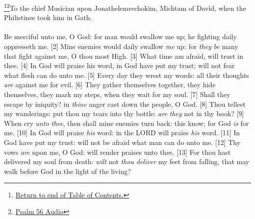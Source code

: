 \footnote{\textcolor[rgb]{0.00,0.25,0.00}{\hyperlink{PsalmsTOC}{Return to end of Table of Contents.}}}\footnote{\href{https://audiobible.com/bible/psalms_56.html}{\textcolor[cmyk]{0.99998,1,0,0}{Psalm 56 Audio}}}\textcolor[cmyk]{0.99998,1,0,0}{To the chief Musician upon Jonathelemrechokim, Michtam of David, when the Philistines took him in Gath.}\\
\\
\textcolor[cmyk]{0.99998,1,0,0}{Be merciful unto me, O God: for man would swallow me up; he fighting daily oppresseth me.}
[2] \textcolor[cmyk]{0.99998,1,0,0}{Mine enemies would daily swallow \emph{me} up: for \emph{they} \emph{be} many that fight against me, O thou most High.}
[3] \textcolor[cmyk]{0.99998,1,0,0}{What time  am afraid,  will trust in thee.}
[4] \textcolor[cmyk]{0.99998,1,0,0}{In God  will praise his word, in God  have put my trust;  will not fear what flesh can do unto me.}
[5] \textcolor[cmyk]{0.99998,1,0,0}{Every day they wrest my words: all their thoughts \emph{are} against me for evil.}
[6] \textcolor[cmyk]{0.99998,1,0,0}{They gather themselves together, they hide themselves, they mark my steps, when they wait for my soul.}
[7] \textcolor[cmyk]{0.99998,1,0,0}{Shall they escape by iniquity? in \emph{thine} anger cast down the people, O God.}
[8] \textcolor[cmyk]{0.99998,1,0,0}{Thou tellest my wanderings: put thou my tears into thy bottle: \emph{are} \emph{they} not in thy book?}
[9] \textcolor[cmyk]{0.99998,1,0,0}{When  cry \emph{unto} \emph{thee}, then shall mine enemies turn back: this  know; for God \emph{is} for me.}
[10] \textcolor[cmyk]{0.99998,1,0,0}{In God will  praise \emph{his} word: in the LORD will  praise \emph{his} word.}
[11] \textcolor[cmyk]{0.99998,1,0,0}{In God have  put my trust:  will not be afraid what man can do unto me.}
[12] \textcolor[cmyk]{0.99998,1,0,0}{Thy vows \emph{are} upon me, O God:  will render praises unto thee.}
[13] \textcolor[cmyk]{0.99998,1,0,0}{For thou hast delivered my soul from death: \emph{wilt} not \emph{thou} \emph{deliver} my feet from falling, that  may walk before God in the light of the living?}



